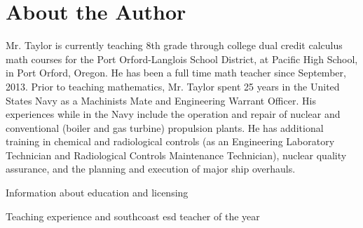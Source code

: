 \section{About the Author}
Mr. Taylor is currently teaching 8th grade through college dual credit calculus math courses for the Port Orford-Langlois School District, at Pacific High School, in Port Orford, Oregon. He has been a full time math teacher since September, 2013. Prior to teaching mathematics, Mr. Taylor spent 25 years in the United States Navy as a Machinists Mate and Engineering Warrant Officer. His experiences while in the Navy include the operation and repair of nuclear and conventional (boiler and gas turbine) propulsion plants. He has additional training in chemical and radiological controls (as an Engineering Laboratory Technician and Radiological Controls Maintenance Technician), nuclear quality assurance, and the planning and execution of major ship overhauls.

Information about education and licensing

Teaching experience and southcoast esd teacher of the year